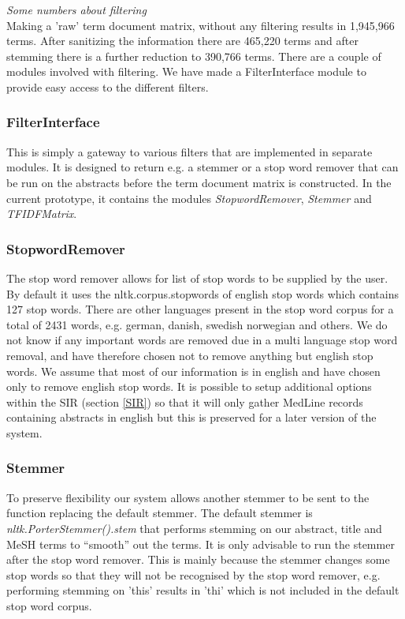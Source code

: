 
\textit{Some numbers about filtering}\\
Making a 'raw' term document matrix, without any filtering results in
1,945,966 terms. After sanitizing the information there are 465,220 terms 
and after stemming there is a further reduction to 390,766 terms.
There are a couple of modules involved with filtering. We have made a
FilterInterface module to provide easy access to the different
filters.

\subsubsection{FilterInterface}
This is simply a gateway to various filters that are implemented in
separate modules. It is designed to return e.g. a stemmer or a stop
word remover that can be run on the abstracts before the term document
matrix is constructed. In the current prototype, it contains the
modules \textit{StopwordRemover}, \textit{Stemmer} and
\textit{TFIDFMatrix}.

\subsubsection{StopwordRemover}
The stop word remover allows for list of stop words to be supplied by
the user. By default it uses the nltk.corpus.stopwords of english stop
words which contains 127 stop words. There are other languages present
in the stop word corpus for a total of 2431 words, e.g. german,
danish, swedish norwegian and others. We do not know if any important
words are removed due in a multi language stop word removal, and have
therefore chosen not to remove anything but english stop words. We
assume that most of our information is in english and have chosen only
to remove english stop words. It is possible to setup additional
options within the SIR (section \ref{SIR}) so that it will only gather
MedLine records containing abstracts in english but this is preserved
for a later version of the system.

\subsubsection{Stemmer}
To preserve flexibility our system allows another stemmer to be sent
to the function replacing the default stemmer. The default stemmer is
\textit{nltk.PorterStemmer().stem} that performs stemming on our
abstract, title and MeSH terms to ``smooth'' out the terms. It is only
advisable to run the stemmer after the stop word remover. This is
mainly because the stemmer changes some stop words so that they will
not be recognised by the stop word remover, e.g. performing stemming
on 'this' results in 'thi' which is not included in the default stop
word corpus.

